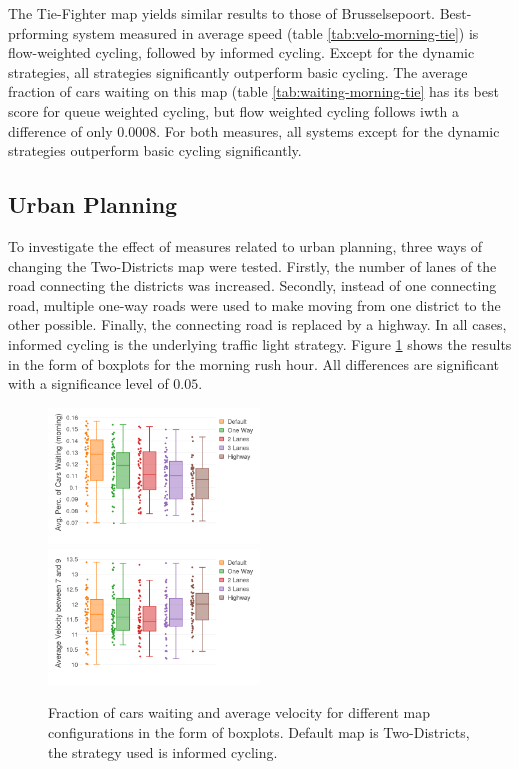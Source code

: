 \documentclass[11pt]{article}
\begin{document}
The Tie-Fighter map yields similar results to those of Brusselsepoort. Best-prforming system measured in average speed (table \ref{tab:velo-morning-tie}) is flow-weighted cycling, followed by informed cycling. Except for the dynamic strategies, all strategies significantly outperform basic cycling. The average fraction of cars waiting on this map (table \ref{tab:waiting-morning-tie} has its best score for queue weighted cycling, but flow weighted cycling follows iwth a difference of only 0.0008. For both measures, all systems except for the dynamic strategies outperform basic cycling significantly.

\subsection{Urban Planning}
To investigate the effect of measures related to urban planning, three ways of changing the Two-Districts map were tested. Firstly, the number of lanes of the road connecting the districts was increased. Secondly, instead of one connecting road, multiple one-way roads were used to make moving from one district to the other possible. Finally, the connecting road is replaced by a highway. In all cases, informed cycling is the underlying traffic light strategy. Figure \ref{fig:urban-planning-stats} shows the results in the form of boxplots for the morning rush hour. All differences are significant with a significance level of $0.05$.

\begin{figure}[t]
	\includegraphics[width=0.5\textwidth]{img/urban_planning_frac.png}
	\includegraphics[width=0.5\textwidth]{img/urban_planning_velo.png}
	\caption{Fraction of cars waiting and average velocity for different map configurations in the form of boxplots. Default map is Two-Districts, the strategy used is informed cycling. \label{fig:urban-planning-stats}}
\end{figure}
\end{document}
